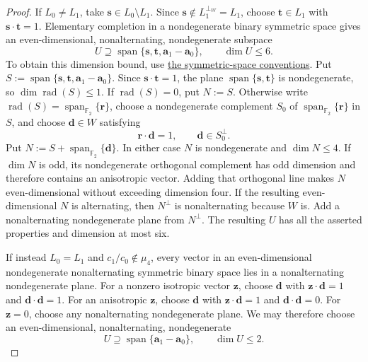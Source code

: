 \documentclass[11pt,letterpaper,onecolumn]{article}
\theoremstyle{plain}
\theoremstyle{definition}
\theoremstyle{remark}
\newcommand{\Ftwo}{\mathbb F_2}
\newcommand{\Span}{\operatorname{span}}
\begin{document}
\begin{proof}
If \(L_0\ne L_1\), take \({\mathbf{s}}\in L_0\setminus L_1\).  Since
\({\mathbf{s}}\notin L_1^{\perp_W}=L_1\), choose \({\mathbf{t}}\in L_1\) with
\({\mathbf{s}}\cdot {\mathbf{t}}=1\).  Elementary completion in a
nondegenerate binary symmetric space gives an even-dimensional,
nonalternating, nondegenerate subspace
\[
 U\supseteq\Span\{{\mathbf{s}},{\mathbf{t}},{\mathbf{a}}_1-{\mathbf{a}}_0\},
 \qquad \dim U\le6.
\]
To obtain this dimension bound, use \hyperref[subsubsec:symmetric-binary-spaces]{the symmetric-space conventions}.
Put \(S:=\Span\{{\mathbf{s}},{\mathbf{t}},{\mathbf{a}}_1-{\mathbf{a}}_0\}\).  Since \({\mathbf{s}}\cdot {\mathbf{t}}=1\), the plane
\(\Span\{{\mathbf{s}},{\mathbf{t}}\}\) is nondegenerate, so
\(\dim\operatorname{rad}(S)\le1\).  If
\(\operatorname{rad}(S)=0\), put \(N:=S\).  Otherwise write
\(\operatorname{rad}(S)=\Span_{\Ftwo}\{{\mathbf{r}}\}\), choose a nondegenerate
complement \(S_0\) of \(\Span_{\Ftwo}\{{\mathbf{r}}\}\) in \(S\), and choose
\({\mathbf{d}}\in W\) satisfying
\[
 {\mathbf{r}}\cdot {\mathbf{d}}=1,
 \qquad
 {\mathbf{d}}\in S_0^\perp.
\]
Put \(N:=S+\Span_{\Ftwo}\{{\mathbf{d}}\}\).  In either case \(N\) is nondegenerate
and \(\dim N\le4\).
If \(\dim N\) is odd, its nondegenerate orthogonal complement has odd
dimension and therefore contains an anisotropic vector. Adding that
orthogonal line makes \(N\) even-dimensional without exceeding dimension
four.  If the resulting even-dimensional \(N\) is alternating, then
\(N^\perp\) is nonalternating because \(W\) is. Add a nonalternating
nondegenerate plane from \(N^\perp\).  The resulting \(U\) has all the
asserted properties and dimension at most six.

If instead \(L_0=L_1\) and \(c_1/c_0\notin\mu_4\), every vector in an
even-dimensional nondegenerate nonalternating symmetric binary space lies in a
nonalternating nondegenerate plane.  For a nonzero isotropic vector \({\mathbf{z}}\),
choose \({\mathbf{d}}\) with \({\mathbf{z}}\cdot {\mathbf{d}}=1\) and \({\mathbf{d}}\cdot {\mathbf{d}}=1\). For an anisotropic
\({\mathbf{z}}\), choose \({\mathbf{d}}\) with \({\mathbf{z}}\cdot {\mathbf{d}}=1\) and \({\mathbf{d}}\cdot {\mathbf{d}}=0\).  For \({\mathbf{z}}=0\),
choose any nonalternating nondegenerate plane.  We may therefore
choose an even-dimensional, nonalternating, nondegenerate
\[
 U\supseteq\Span\{{\mathbf{a}}_1-{\mathbf{a}}_0\},
 \qquad \dim U\le2.
\]


\end{proof}
\end{document}
